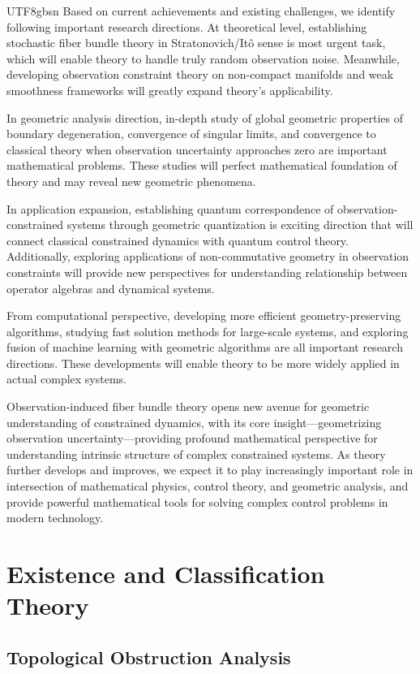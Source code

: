 \documentclass[a4paper,12pt]{extarticle}
\theoremstyle{definition}
\begin{document}
\begin{CJK}{UTF8}{gbsn}
Based on current achievements and existing challenges, we identify following important research directions. At theoretical level, establishing stochastic fiber bundle theory in Stratonovich/Itô sense is most urgent task, which will enable theory to handle truly random observation noise. Meanwhile, developing observation constraint theory on non-compact manifolds and weak smoothness frameworks will greatly expand theory's applicability.

In geometric analysis direction, in-depth study of global geometric properties of boundary degeneration, convergence of singular limits, and convergence to classical theory when observation uncertainty approaches zero are important mathematical problems. These studies will perfect mathematical foundation of theory and may reveal new geometric phenomena.

In application expansion, establishing quantum correspondence of observation-constrained systems through geometric quantization is exciting direction that will connect classical constrained dynamics with quantum control theory. Additionally, exploring applications of non-commutative geometry in observation constraints will provide new perspectives for understanding relationship between operator algebras and dynamical systems.

From computational perspective, developing more efficient geometry-preserving algorithms, studying fast solution methods for large-scale systems, and exploring fusion of machine learning with geometric algorithms are all important research directions. These developments will enable theory to be more widely applied in actual complex systems.

Observation-induced fiber bundle theory opens new avenue for geometric understanding of constrained dynamics, with its core insight—geometrizing observation uncertainty—providing profound mathematical perspective for understanding intrinsic structure of complex constrained systems. As theory further develops and improves, we expect it to play increasingly important role in intersection of mathematical physics, control theory, and geometric analysis, and provide powerful mathematical tools for solving complex control problems in modern technology.


\appendix


\section{Existence and Classification Theory}
\subsection{Topological Obstruction Analysis}



\end{CJK}
\end{document}
